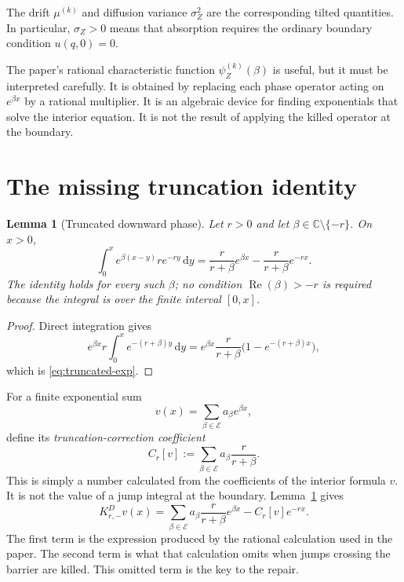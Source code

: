 \documentclass[11pt]{article}
\newcommand{\diff}{\mathrm{d}}
\newcommand{\Rea}{\operatorname{Re}}
\theoremstyle{plain}
\newtheorem{lemma}{Lemma}
\theoremstyle{remark}
\begin{document}
The drift $\mu^{(k)}$ and diffusion variance $\sigma_Z^2$ are the corresponding
tilted quantities.  In particular, $\sigma_Z>0$ means that absorption requires
the ordinary boundary condition $u(q,0)=0$.

The paper's rational characteristic function $\psi_Z^{(k)}(\beta)$ is useful,
but it must be interpreted carefully.  It is obtained by replacing each phase
operator acting on $e^{\beta x}$ by a rational multiplier.  It is an algebraic
device for finding exponentials that solve the interior equation.  It is not
the result of applying the killed operator at the boundary.

\section{The missing truncation identity}

\begin{lemma}[Truncated downward phase]\label{lem:truncated}
Let $r>0$ and let $\beta\in\mathbb{C}\setminus\{-r\}$.  On $x>0$,
\begin{equation}\label{eq:truncated-exp}
\int_0^x e^{\beta(x-y)}r e^{-ry}\,\diff y
=\frac{r}{r+\beta}e^{\beta x}
 -\frac{r}{r+\beta}e^{-rx}.
\end{equation}
The identity holds for every such $\beta$; no condition
$\Rea(\beta)>-r$ is required because the integral is over the finite interval
$[0,x]$.
\end{lemma}

\begin{proof}
Direct integration gives
\[
e^{\beta x}r\int_0^x e^{-(r+\beta)y}\,\diff y
=e^{\beta x}\frac{r}{r+\beta}
  \bigl(1-e^{-(r+\beta)x}\bigr),
\]
which is \eqref{eq:truncated-exp}.
\end{proof}

For a finite exponential sum
\[
v(x)=\sum_{\beta\in\mathcal E}a_\beta e^{\beta x},
\]
define its \emph{truncation-correction coefficient}
\begin{equation}\label{eq:phase-functional}
C_r[v]
:=\sum_{\beta\in\mathcal E}a_\beta\frac{r}{r+\beta}.
\end{equation}
This is simply a number calculated from the coefficients of the interior
formula $v$.  It is not the value of a jump integral at the boundary.
Lemma~\ref{lem:truncated} gives
\begin{equation}\label{eq:phase-decomposition}
K_{r,-}^{D}v(x)
=\sum_{\beta\in\mathcal E}
  a_\beta\frac{r}{r+\beta}e^{\beta x}
 -C_r[v]e^{-rx}.
\end{equation}
The first term is the expression produced by the rational calculation used in
the paper.  The second term is what that calculation omits when jumps crossing
the barrier are killed.  This omitted term is the key to the repair.
\end{document}
